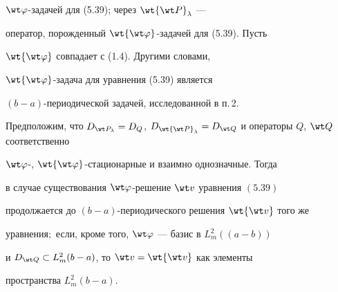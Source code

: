 $\wt\varphi$-задачей для (5.39); через $\wt{\wt P}_\lambda$ --- 


оператор, порожденный $\wt{\wt\varphi}$-задачей для (5.39). Пусть 


$\wt{\wt\varphi}$ совпадает с (1.4). Другими словами, 


$\wt{\wt\varphi}$-задача для уравнения (5.39) является 


$(b{-}a)$-периодической задачей, исследованной в п.\,2. 


 


\begin{thms} 


Предположим, что $D_{\wt P_\lambda}=D_Q$, $D_{\wt{\wt 


P}_\lambda}=D_{\wt Q}$ и операторы $Q$, $\wt Q$ соответственно 


$\wt\varphi$-, $\wt{\wt\varphi}$-стационарные и взаимно однозначные. Тогда 


в случае существования $\wt\varphi$-решение $\wt v$ уравнения $(5.39)$ 


продолжается до $(b{-}a)$-периодического решения $\wt{\wt v}$ того же 


уравнения$;$ если, кроме того, $\wt\varphi$ --- базис в $L^2_m((a-b))$ 


и $D_{\wt Q}\subset L^2_m(b-a)$, то $\wt v=\wt{\wt v}$ как элементы 


пространства $L^2_m(b-a)$. 


\end{thms} 


 


